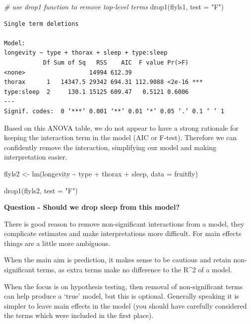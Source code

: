\documentclass[
]{book}
\newenvironment{Shaded}{\begin{snugshade}}{\end{snugshade}}
\newcommand{\AttributeTok}[1]{\textcolor[rgb]{0.77,0.63,0.00}{#1}}
\newcommand{\CommentTok}[1]{\textcolor[rgb]{0.56,0.35,0.01}{\textit{#1}}}
\newcommand{\FunctionTok}[1]{\textcolor[rgb]{0.00,0.00,0.00}{#1}}
\newcommand{\NormalTok}[1]{#1}
\newcommand{\OtherTok}[1]{\textcolor[rgb]{0.56,0.35,0.01}{#1}}
\newcommand{\SpecialCharTok}[1]{\textcolor[rgb]{0.00,0.00,0.00}{#1}}
\newcommand{\StringTok}[1]{\textcolor[rgb]{0.31,0.60,0.02}{#1}}
\begin{document}
\begin{Shaded}
\begin{Highlighting}[]
\CommentTok{\# use drop1 function to remove top{-}level terms}
\FunctionTok{drop1}\NormalTok{(flyls1, }\AttributeTok{test =} \StringTok{"F"}\NormalTok{)}
\end{Highlighting}
\end{Shaded}

\begin{verbatim}
Single term deletions

Model:
longevity ~ type + thorax + sleep + type:sleep
           Df Sum of Sq   RSS    AIC  F value Pr(>F)    
<none>                  14994 612.39                    
thorax      1   14347.5 29342 694.31 112.9088 <2e-16 ***
type:sleep  2     130.1 15125 609.47   0.5121 0.6006    
---
Signif. codes:  0 ‘***’ 0.001 ‘**’ 0.01 ‘*’ 0.05 ‘.’ 0.1 ‘ ’ 1
\end{verbatim}

Based on this ANOVA table, we do not appear to have a strong rationale for keeping the interaction term in the model (AIC or F-test). Therefore we can confidently remove the interaction, simplifying our model and making interpretation easier.

\begin{Shaded}
\begin{Highlighting}[]
\NormalTok{flyls2 }\OtherTok{\textless{}{-}} \FunctionTok{lm}\NormalTok{(longevity }\SpecialCharTok{\textasciitilde{}}\NormalTok{ type }\SpecialCharTok{+}\NormalTok{ thorax }\SpecialCharTok{+}\NormalTok{ sleep, }\AttributeTok{data =}\NormalTok{ fruitfly)}

\FunctionTok{drop1}\NormalTok{(flyls2, }\AttributeTok{test =} \StringTok{"F"}\NormalTok{)}
\end{Highlighting}
\end{Shaded}

\textbf{Question - Should we drop sleep from this model?}

There is good reason to remove non-significant interactions from a model, they complicate estimates and make interpretations more difficult. For main effects things are a little more ambiguous.

When the main aim is prediction, it makes sense to be cautious and retain non-significant terms, as extra terms make no difference to the R\^{}2 of a model.

When the focus is on hypothesis testing, then removal of non-significant terms can help produce a `true' model, but this is optional. Generally speaking it is simpler to leave main effects in the model (you should have carefully considered the terms which were included in the first place).
\end{document}
